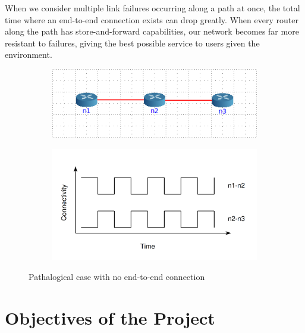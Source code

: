 \documentclass[withindex,glossary,openany]{cam-thesis}
\begin{document}
When we consider multiple link failures occurring along a path at once, the total time where an end-to-end connection exists can drop greatly. When every router along the path has store-and-forward capabilities, our network becomes far more resistant to failures, giving the best possible service to users given the environment.

\begin{center}
\begin{minipage}{0.9\textwidth} \centering
\begin{figure}[H]
\centering
\begin{subfigure}{.45\textwidth}
  \centering
  \includegraphics[width=1\linewidth]{pathalogical_topology}
  \label{fig:pathalogical_topology}
\end{subfigure}%
\begin{subfigure}{.55\textwidth}
  \centering
  \includegraphics[width=1\linewidth]{pathalogical_graph}
  \label{fig:pathalogical_graph}
\end{subfigure}
\caption{Pathalogical case with no end-to-end connection}
\label{fig:pathalogical}
\end{figure}
\end{minipage}
\end{center}

\section{Objectives of the Project}
\end{document}

